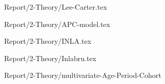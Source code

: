 {Report/2-Theory/Lee-Carter.tex}

{Report/2-Theory/APC-model.tex}

{Report/2-Theory/INLA.tex}

{Report/2-Theory/Inlabru.tex}

{Report/2-Theory/multivariate-Age-Period-Cohort}